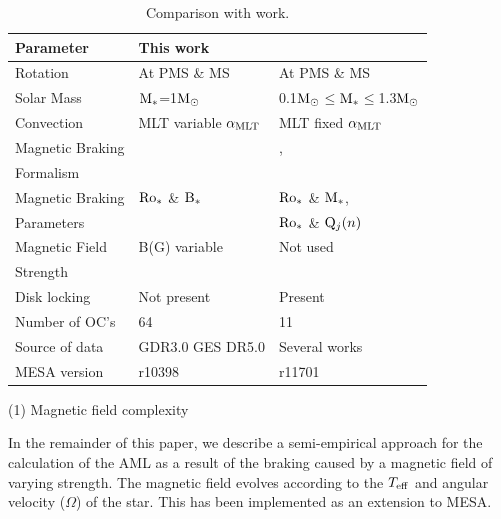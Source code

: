 \documentclass[fleqn,usenatbib]{mnras}
\begin{document}
\begin{table}
	\centering
	\caption{Comparison with \cite{Gossage2021} work.}
	\label{tab:gassage_vs_navarro}
        \begin{threeparttable}
	\begin{tabular}{lll} 
		\hline
		Parameter & This work & \cite{Gossage2021}\\
		\hline
            
		Rotation & At PMS \& MS & At PMS \& MS\\
  		Solar Mass & $\mathrm{M}_*$=1$\mathrm{M}_\odot$ & 0.1$\mathrm{M}_\odot$$\le$$\mathrm{M}_*$$\le$1.3$\mathrm{M}_\odot$ \\
		Convection & MLT variable $\alpha_{{\rm MLT}}$ & MLT fixed $\alpha_{{\rm MLT}}$\\
		Magnetic Braking & \cite{Gallet2013} & \cite{Matt2015}, \\ Formalism & & \cite{Garraffo2018}\\
            Magnetic Braking & $\mathrm{Ro}_*$ \& $\mathrm{B}_*$ & $\mathrm{Ro}_*$ \& $\mathrm{M}_*$, \\ Parameters & & $\mathrm{Ro}_*$ \& $\mathrm{Q}_j(n)$\tnote{(1)}\\
		Magnetic Field & B(G) variable & Not used\\ Strength & & \\
            Disk locking & Not present & Present\\
            Number of OC's & 64 & 11 \\
            Source of data & GDR3.0 GES DR5.0 & Several works \\
            MESA version & r10398 & r11701\\
		\hline
	\end{tabular}
        \end{threeparttable}
        \begin{tablenotes}\footnotesize
        \item (1) Magnetic field complexity
        \end{tablenotes}
\end{table}



In the remainder of this paper, we describe a semi-empirical approach for the calculation of the AML as a result of the braking caused by a magnetic field of varying strength. The magnetic field evolves according to the $T_{\mathrm{eff}}$ and angular velocity ($\Omega$) of the star. This has been implemented as an extension to MESA.\par
\end{document}
